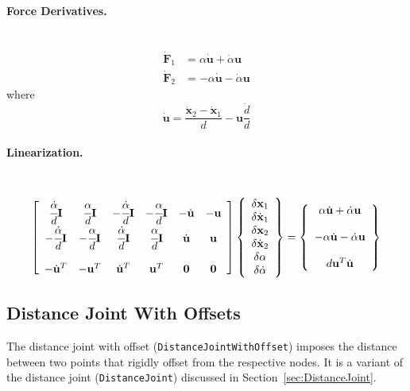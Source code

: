 \documentclass[10pt,dvips,fleqn,subeqn]{report}
\newcommand{\T}[1]{\bm{\mathbf{#1}}}
\begin{document}
\paragraph{Force Derivatives.} \
\begin{subequations}
\begin{align}
	\dot{\T{F}}_1 &= \alpha \dot{\T{u}} + \dot{\alpha} \T{u} \\
	\dot{\T{F}}_2 &= -\alpha \dot{\T{u}} - \dot{\alpha} \T{u}
\end{align}
\end{subequations}
where
\begin{equation}
	\dot{\T{u}} = \frac{\dot{\T{x}}_2 - \dot{\T{x}}_1}{d} - \T{u} \frac{\dot{d}}{d}
\end{equation}

\paragraph{Linearization.} \
\begin{equation}
        \sqbr{\matr{cccccc}{
		\cfrac{\dot{\alpha}}{d}\T{I} & \cfrac{\alpha}{d}\T{I} &
			-\cfrac{\dot{\alpha}}{d}\T{I} & -\cfrac{\alpha}{d}\T{I} &
			-\dot{\T{u}} & -\T{u} \\
		-\cfrac{\dot{\alpha}}{d}\T{I} & -\cfrac{\alpha}{d}\T{I} &
			\cfrac{\dot{\alpha}}{d}\T{I} & \cfrac{\alpha}{d}\T{I} &
			\dot{\T{u}} & \T{u} \\
		\\
		-\dot{\T{u}}^T & -\T{u}^T & \dot{\T{u}}^T & \T{u}^T & \T{0} & \T{0}
	}}\cubr{\cvvect{
		\delta\T{x}_1 \\
		\delta\dot{\T{x}}_1 \\
		\delta\T{x}_2 \\
		\delta\dot{\T{x}}_2 \\
		\delta\alpha \\
		\delta\dot{\alpha}
	}} = \cubr{\cvvect{
		\alpha \dot{\T{u}} + \dot{\alpha} \T{u} \\
		\\
		-\alpha \dot{\T{u}} - \dot{\alpha} \T{u} \\
		\\
		d \T{u}^T \dot{\T{u}}
	}}
\end{equation}




\subsection{Distance Joint With Offsets}
\label{sec:DistanceJointWithOffset}
The distance joint with offset (\texttt{DistanceJointWithOffset}) 
imposes the distance between two points
that rigidly offset from the respective nodes.
It is a variant of the distance joint (\texttt{DistanceJoint})
discussed in Section~\ref{sec:DistanceJoint}.
\end{document}
